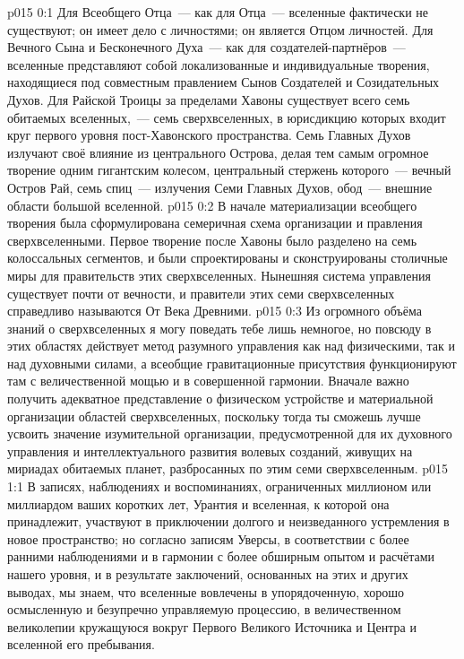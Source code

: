 \author{Всеобщий Цензор}
\vs p015 0:1 Для Всеобщего Отца~--- как для Отца~--- вселенные фактически не существуют; он имеет дело с личностями; он является Отцом личностей. Для Вечного Сына и Бесконечного Духа~--- как для создателей\hyp{}партнёров~--- вселенные представляют собой локализованные и индивидуальные творения, находящиеся под совместным правлением Сынов Создателей и Созидательных Духов. Для Райской Троицы за пределами Хавоны существует всего семь обитаемых вселенных,~--- семь сверхвселенных, в юрисдикцию которых входит круг первого уровня пост\hyp{}Хавонского пространства. Семь Главных Духов излучают своё влияние из центрального Острова, делая тем самым огромное творение одним гигантским колесом, центральный стержень которого~--- вечный Остров Рай, семь спиц~--- излучения Семи Главных Духов, обод~--- внешние области большой вселенной.
\vs p015 0:2 В начале материализации всеобщего творения была сформулирована семеричная схема организации и правления сверхвселенными. Первое творение после Хавоны было разделено на семь колоссальных сегментов, и были спроектированы и сконструированы столичные миры для правительств этих сверхвселенных. Нынешняя система управления существует почти от вечности, и правители этих семи сверхвселенных справедливо называются От Века Древними.
\vs p015 0:3 Из огромного объёма знаний о сверхвселенных я могу поведать тебе лишь немногое, но повсюду в этих областях действует метод разумного управления как над физическими, так и над духовными силами, а всеобщие гравитационные присутствия функционируют там с величественной мощью и в совершенной гармонии. Вначале важно получить адекватное представление о физическом устройстве и материальной организации областей сверхвселенных, поскольку тогда ты сможешь лучше усвоить значение изумительной организации, предусмотренной для их духовного управления и интеллектуального развития волевых созданий, живущих на мириадах обитаемых планет, разбросанных по этим семи сверхвселенным.
\vs p015 1:1 В записях, наблюдениях и воспоминаниях, ограниченных миллионом или миллиардом ваших коротких лет, Урантия и вселенная, к которой она принадлежит, участвуют в приключении долгого и неизведанного устремления в новое пространство; но согласно записям Уверсы, в соответствии с более ранними наблюдениями и в гармонии с более обширным опытом и расчётами нашего уровня, и в результате заключений, основанных на этих и других выводах, мы знаем, что вселенные вовлечены в упорядоченную, хорошо осмысленную и безупречно управляемую процессию, в величественном великолепии кружащуюся вокруг Первого Великого Источника и Центра и вселенной его пребывания.
